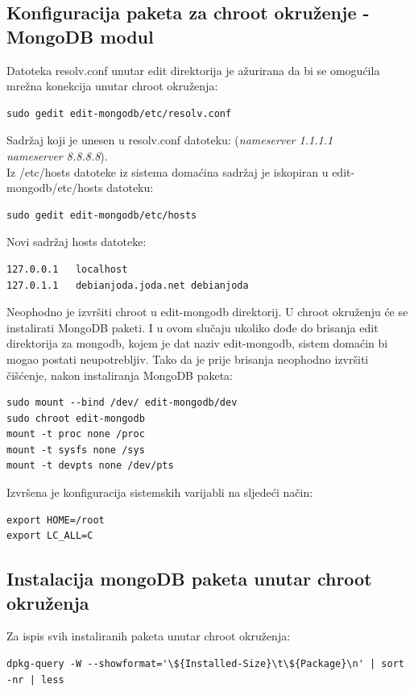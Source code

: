 \documentclass[12pt,vi]{mitthesis}
\begin{document}
\subsection*{Konfiguracija paketa za chroot okruženje - MongoDB modul}
\noindent
Datoteka resolv.conf unutar edit direktorija je ažurirana da bi se omogućila mrežna konekcija unutar chroot okruženja:
\begin{lstlisting}[style=BashInputStyle]
sudo gedit edit-mongodb/etc/resolv.conf
\end{lstlisting}
Sadržaj koji je unesen u resolv.conf datoteku:
(\textit{nameserver 1.1.1.1 \\
nameserver 8.8.8.8}).\\
\noindent
Iz /etc/hosts datoteke iz sistema domaćina sadržaj je iskopiran u edit-mongodb/etc/hosts datoteku:
\begin{lstlisting}[style=BashInputStyle]
sudo gedit edit-mongodb/etc/hosts
\end{lstlisting}
Novi sadržaj hosts datoteke:
\begin{lstlisting}
127.0.0.1	localhost
127.0.1.1	debianjoda.joda.net	debianjoda
\end{lstlisting}
\noindent
Neophodno je izvršiti chroot u edit-mongodb direktorij. U chroot okruženju će se instalirati MongoDB paketi. I u ovom slučaju ukoliko dođe do brisanja edit direktorija za mongodb, kojem je dat naziv edit-mongodb, sistem domaćin bi mogao postati neupotrebljiv. Tako da je prije brisanja neophodno izvršiti čišćenje, nakon instaliranja MongoDB paketa:
\begin{lstlisting}[style=BashInputStyle]
sudo mount --bind /dev/ edit-mongodb/dev
sudo chroot edit-mongodb
mount -t proc none /proc
mount -t sysfs none /sys
mount -t devpts none /dev/pts
\end{lstlisting}

\noindent
Izvršena je konfiguracija sistemskih varijabli na sljedeći način:
\begin{lstlisting}[style=BashInputStyle]
export HOME=/root
export LC_ALL=C
\end{lstlisting}

\subsection*{Instalacija mongoDB paketa unutar chroot okruženja}
\noindent
Za ispis svih instaliranih paketa unutar chroot okruženja:
\begin{lstlisting}[style=BashInputStyle]
dpkg-query -W --showformat='\${Installed-Size}\t\${Package}\n' | sort -nr | less
\end{lstlisting}
\end{document}
